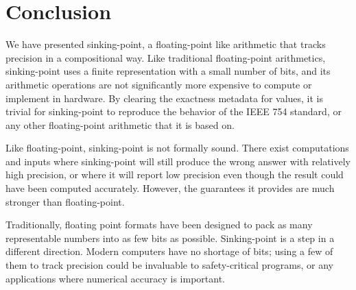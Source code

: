 \documentclass[letterpaper,10pt]{article}
\begin{document}
\section{Conclusion}

We have presented sinking-point, a floating-point like arithmetic that tracks precision in a compositional way. Like traditional floating-point arithmetics, sinking-point uses a finite representation with a small number of bits, and its arithmetic operations are not significantly more expensive to compute or implement in hardware. By clearing the exactness metadata for values, it is trivial for sinking-point to reproduce the behavior of the IEEE 754 standard, or any other floating-point arithmetic that it is based on.

Like floating-point, sinking-point is not formally sound. There exist computations and inputs where sinking-point will still produce the wrong answer with relatively high precision, or where it will report low precision even though the result could have been computed accurately. However, the guarantees it provides are much stronger than floating-point.

Traditionally, floating point formats have been designed to pack as many representable numbers into as few bits as possible. Sinking-point is a step in a different direction. Modern computers have no shortage of bits; using a few of them to track precision could be invaluable to safety-critical programs, or any applications where numerical accuracy is important.




\end{document}
